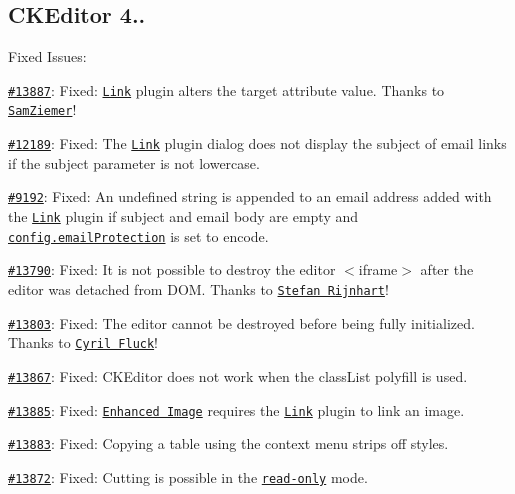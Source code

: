 \subsection*{C\+K\+Editor 4..}

Fixed Issues\+:


\begin{DoxyItemize}
\item \href{https://dev.ckeditor.com/ticket/13887}{\tt \#13887}\+: Fixed\+: \href{http://ckeditor.com/addon/link}{\tt Link} plugin alters the {\ttfamily target} attribute value. Thanks to \href{https://github.com/SamZiemer}{\tt Sam\+Ziemer}!
\item \href{http://dev.ckeditor.com/ticket/12189}{\tt \#12189}\+: Fixed\+: The \href{http://ckeditor.com/addon/link}{\tt Link} plugin dialog does not display the subject of email links if the subject parameter is not lowercase.
\item \href{http://dev.ckeditor.com/ticket/9192}{\tt \#9192}\+: Fixed\+: An {\ttfamily undefined} string is appended to an email address added with the \href{http://ckeditor.com/addon/link}{\tt Link} plugin if subject and email body are empty and \href{http://docs.ckeditor.com/#!/api/CKEDITOR.config-cfg-emailProtection}{\tt {\ttfamily config.\+email\+Protection}} is set to {\ttfamily encode}.
\item \href{https://dev.ckeditor.com/ticket/13790}{\tt \#13790}\+: Fixed\+: It is not possible to destroy the editor {\ttfamily $<$iframe$>$} after the editor was detached from D\+OM. Thanks to \href{https://github.com/StefanRijnhart}{\tt Stefan Rijnhart}!
\item \href{https://dev.ckeditor.com/ticket/13803}{\tt \#13803}\+: Fixed\+: The editor cannot be destroyed before being fully initialized. Thanks to \href{https://github.com/cyril-sf}{\tt Cyril Fluck}!
\item \href{http://dev.ckeditor.com/ticket/13867}{\tt \#13867}\+: Fixed\+: C\+K\+Editor does not work when the {\ttfamily class\+List} polyfill is used.
\item \href{http://dev.ckeditor.com/ticket/13885}{\tt \#13885}\+: Fixed\+: \href{http://ckeditor.com/addon/image2}{\tt Enhanced Image} requires the \href{http://ckeditor.com/addon/link}{\tt Link} plugin to link an image.
\item \href{http://dev.ckeditor.com/ticket/13883}{\tt \#13883}\+: Fixed\+: Copying a table using the context menu strips off styles.
\item \href{http://dev.ckeditor.com/ticket/13872}{\tt \#13872}\+: Fixed\+: Cutting is possible in the \href{http://docs.ckeditor.com/#!/api/CKEDITOR.editor-property-readOnly}{\tt read-\/only} mode.

\end{DoxyItemize}
